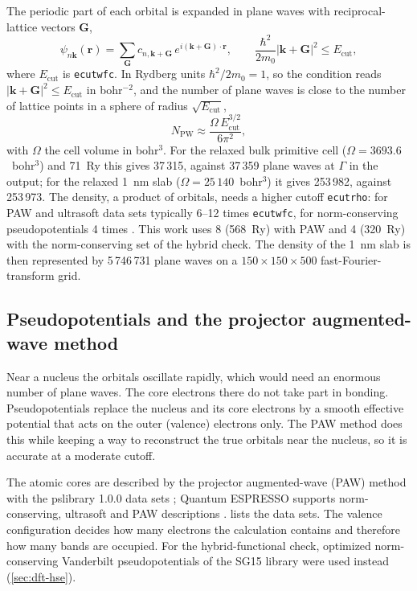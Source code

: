 The periodic part of each orbital is expanded in plane waves with reciprocal-lattice vectors $\mathbf{G}$,
\begin{equation}
\psi_{n\mathbf{k}}(\mathbf{r}) = \sum_{\mathbf{G}} c_{n,\mathbf{k}+\mathbf{G}}\,e^{i(\mathbf{k}+\mathbf{G})\cdot\mathbf{r}},
\qquad \frac{\hbar^2}{2m_0}|\mathbf{k}+\mathbf{G}|^2 \le E_{\mathrm{cut}} ,
\label{eq:dft-pw}
\end{equation}
where $E_{\mathrm{cut}}$ is \texttt{ecutwfc}. In Rydberg units $\hbar^2/2m_0 = 1$, so the condition reads
$|\mathbf{k}+\mathbf{G}|^2 \le E_{\mathrm{cut}}$ in bohr$^{-2}$, and the number of plane waves is close to the number of
lattice points in a sphere of radius $\sqrt{E_{\mathrm{cut}}}$,
\begin{equation}
N_{\mathrm{PW}} \approx \frac{\Omega\,E_{\mathrm{cut}}^{3/2}}{6\pi^2} ,
\label{eq:dft-npw}
\end{equation}
with $\Omega$ the cell volume in bohr$^3$. For the relaxed bulk primitive cell ($\Omega = 3693.6$~bohr$^3$) and
71~Ry this gives 37\,315, against 37\,359 plane waves at $\Gamma$ in the output; for the relaxed 1~nm slab
($\Omega = 25\,140$~bohr$^3$) it gives 253\,982, against 253\,973. The density, a product of orbitals, needs a higher
cutoff \texttt{ecutrho}: for PAW and ultrasoft data sets typically 6--12 times \texttt{ecutwfc}, for norm-conserving
pseudopotentials 4 times \citep[p.~7]{Giannozzi2009}. This work uses 8 (568~Ry) with PAW and 4 (320~Ry) with the
norm-conserving set of the hybrid check. The density of the 1~nm slab is then represented by 5\,746\,731 plane waves on
a $150\times150\times500$ fast-Fourier-transform grid.

\subsection{Pseudopotentials and the projector augmented-wave method}
\label{sec:dft-pp}

\begin{dftplain}
Near a nucleus the orbitals oscillate rapidly, which would need an enormous number of plane waves. The core electrons
there do not take part in bonding. Pseudopotentials replace the nucleus and its core electrons by a smooth effective
potential that acts on the outer (valence) electrons only. The PAW method does this while keeping a way to reconstruct
the true orbitals near the nucleus, so it is accurate at a moderate cutoff.
\end{dftplain}

The atomic cores are described by the projector augmented-wave (PAW) method \citep{Bloechl1994,Kresse1999} with the
pslibrary 1.0.0 data sets \citep{DalCorso2014}; Quantum ESPRESSO supports norm-conserving, ultrasoft and PAW
descriptions \citep[pp.~5, 7]{Giannozzi2009}.  lists the data sets. The valence configuration decides
how many electrons the calculation contains and therefore how many bands are occupied. For the hybrid-functional check,
optimized norm-conserving Vanderbilt pseudopotentials \citep{Hamann2013} of the SG15 library \citep{Schlipf2015} were
used instead (\cref{sec:dft-hse}).

